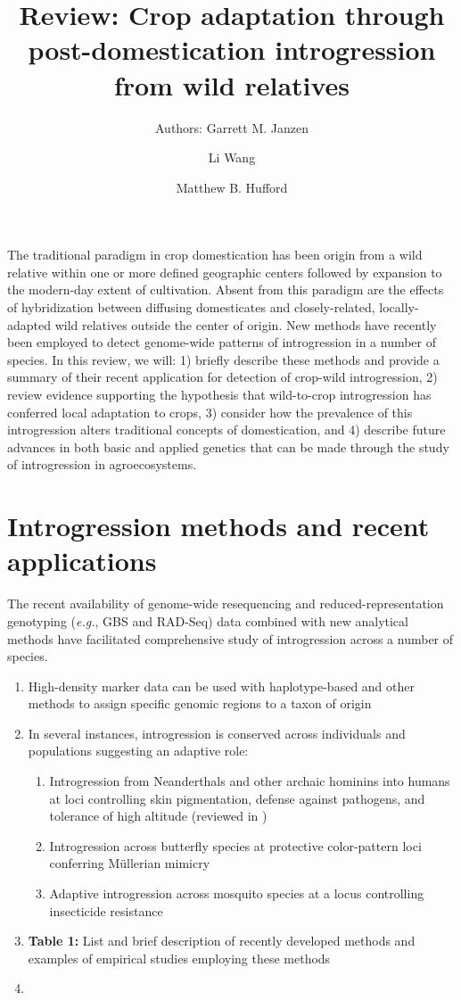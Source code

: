 \documentclass[11pt]{article}
\title{Review: Crop adaptation through post-domestication introgression from wild relatives}
\author[1]{Authors: Garrett M. Janzen}%
\author[1]{Li Wang}
\author[1,*]{Matthew B. Hufford}
\affil[1]{Department of Ecology, Evolution, and Organismal Biology, Iowa State University, Ames, Iowa, USA}
\affil[*]{Correspondence: mhufford@iastate.edu (M.B. Hufford)}
\date{}
\begin{document}
\maketitle

The traditional paradigm in crop domestication has been origin from a wild relative within one or more defined geographic centers followed by expansion to the modern-day extent of cultivation.
Absent from this paradigm are the effects of hybridization between diffusing domesticates and closely-related, locally-adapted wild relatives outside the center of origin.
New methods have recently been employed to detect genome-wide patterns of introgression in a number of species.
In this review, we will: 1) briefly describe these methods and provide a summary of their recent application for detection of crop-wild introgression, 2) review evidence supporting the hypothesis that wild-to-crop introgression has conferred local adaptation to crops, 3) consider how the prevalence of this introgression alters traditional concepts of domestication, and 4) describe future advances in both basic and applied genetics that can be made through the study of introgression in agroecosystems.

\section*{Introgression methods and recent applications}
The recent availability of genome-wide resequencing and reduced-representation genotyping (\emph{e.g.}, GBS and RAD-Seq) data combined with new analytical methods have facilitated comprehensive study of introgression across a number of species.
\begin{enumerate}
\item{High-density marker data can be used with haplotype-based and other methods to assign specific genomic regions to a taxon of origin}
\item{In several instances, introgression is conserved across individuals and populations suggesting an adaptive role:}
	\begin{enumerate}
	\item{Introgression from Neanderthals and other archaic hominins into humans at loci controlling skin pigmentation, defense against pathogens, and tolerance of high altitude (reviewed in \cite{Racimo2015}})
	\item{Introgression across butterfly species at protective color-pattern loci conferring M\"{u}llerian mimicry \cite{Heliconius2012}}
	\item{Adaptive introgression across mosquito species at a locus controlling insecticide resistance \cite{Norris2015}}
	\end{enumerate} 
\item{\textbf{Table 1:} List and brief description of recently developed methods and examples of empirical studies employing these methods}
\item{}
\end{enumerate}
\end{document}
